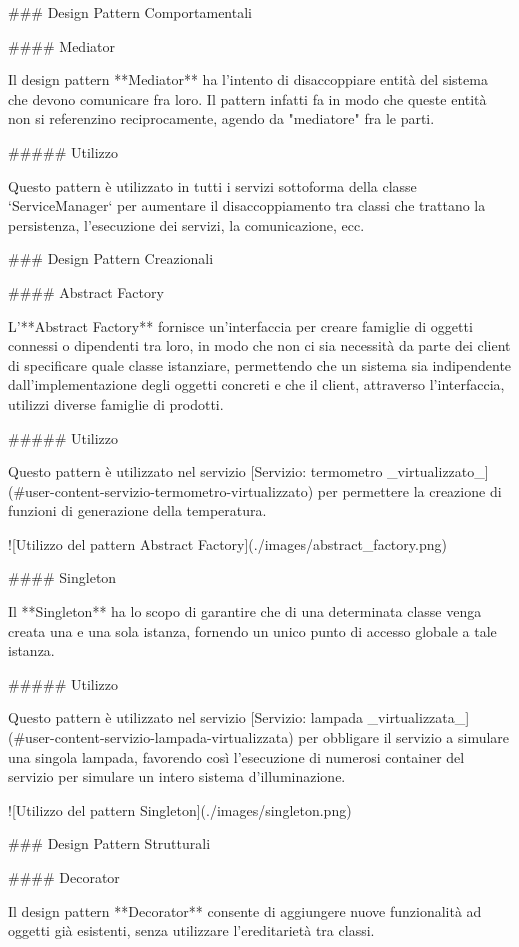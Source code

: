 ### Design Pattern Comportamentali

#### Mediator

Il design pattern **Mediator** ha l'intento di disaccoppiare entità del sistema che devono comunicare fra loro. Il pattern infatti fa in modo che queste entità non si referenzino reciprocamente, agendo da "mediatore" fra le parti.

##### Utilizzo

Questo pattern è utilizzato in tutti i servizi sottoforma della classe `ServiceManager` per aumentare il disaccoppiamento tra classi che trattano la persistenza, l'esecuzione dei servizi, la comunicazione, ecc.

### Design Pattern Creazionali

#### Abstract Factory

L'**Abstract Factory** fornisce un'interfaccia per creare famiglie di oggetti connessi o dipendenti tra loro, in modo che non ci sia necessità da parte dei client di specificare quale classe istanziare, permettendo che un sistema sia indipendente dall'implementazione degli oggetti concreti e che il client, attraverso l'interfaccia, utilizzi diverse famiglie di prodotti.

##### Utilizzo

Questo pattern è utilizzato nel servizio [Servizio: termometro _virtualizzato_](#user-content-servizio-termometro-virtualizzato) per permettere la creazione di funzioni di generazione della temperatura.

![Utilizzo del pattern Abstract Factory](./images/abstract_factory.png)

#### Singleton

Il **Singleton** ha lo scopo di garantire che di una determinata classe venga creata una e una sola istanza, fornendo un unico punto di accesso globale a tale istanza.

##### Utilizzo

Questo pattern è utilizzato nel servizio [Servizio: lampada _virtualizzata_](#user-content-servizio-lampada-virtualizzata) per obbligare il servizio a simulare una singola lampada, favorendo così l'esecuzione di numerosi container del servizio per simulare un intero sistema d'illuminazione.

![Utilizzo del pattern Singleton](./images/singleton.png)

### Design Pattern Strutturali

#### Decorator

Il design pattern **Decorator** consente di aggiungere nuove funzionalità ad oggetti già esistenti, senza utilizzare l'ereditarietà tra classi.

